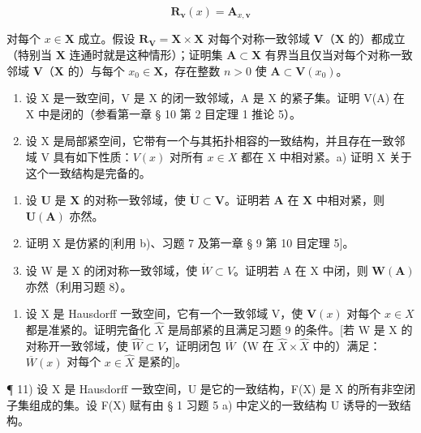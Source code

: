\[
\mathbf {R} _ {\mathbf {v}} (x) = \mathbf {A} _ {x, \mathbf {v}}
\]

对每个 \(x \in \mathbf{X}\) 成立。假设 \(\mathbf{R}_{\mathbf{V}} = \mathbf{X} \times \mathbf{X}\) 对每个对称一致邻域 \(\mathbf{V}\)（\(\mathbf{X}\) 的）都成立（特别当 \(\mathbf{X}\) 连通时就是这种情形）；证明集 \(\mathbf{A} \subset \mathbf{X}\) 有界当且仅当对每个对称一致邻域 \(\mathbf{V}\)（\(\mathbf{X}\) 的）与每个 \(x_0 \in \mathbf{X}\)，存在整数 \(n > 0\) 使 \(\mathbf{A} \subset \mathbf{V}(x_0)\)。

\begin{enumerate}
\def\labelenumi{\arabic{enumi})}
\setcounter{enumi}{7}
\item
  设 X 是一致空间，V 是 X 的闭一致邻域，A 是 X 的紧子集。证明 V(A) 在 X 中是闭的（参看第一章 § 10 第 2 目定理 1 推论 5）。
\item
  设 X 是局部紧空间，它带有一个与其拓扑相容的一致结构，并且存在一致邻域 V 具有如下性质：\(V(x)\) 对所有 \(x \in X\) 都在 X 中相对紧。a) 证明 X 关于这个一致结构是完备的。
\end{enumerate}

\begin{enumerate}
\def\labelenumi{\alph{enumi})}
\setcounter{enumi}{1}
\item
  设 \(\mathbf{U}\) 是 \(\mathbf{X}\) 的对称一致邻域，使 \(\dot{\mathbf{U}}\subset\mathbf{V}\)。证明若 \(\mathbf{A}\) 在 \(\mathbf{X}\) 中相对紧，则 \(\mathbf{U}(\mathbf{A})\) 亦然。
\item
  证明 X 是仿紧的{[}利用 b)、习题 7 及第一章 § 9 第 10 目定理 5{]}。
\item
  设 W 是 X 的闭对称一致邻域，使 \(\dot{W} \subset V\)。证明若 A 在 X 中闭，则 \(\mathbf{W}(\mathbf{A})\) 亦然（利用习题 8）。
\end{enumerate}

\begin{enumerate}
\def\labelenumi{\arabic{enumi})}
\setcounter{enumi}{9}
\tightlist
\item
  设 X 是 Hausdorff 一致空间，它有一个一致邻域 V，使 \(\mathbf{V}(x)\) 对每个 \(x \in X\) 都是准紧的。证明完备化 \(\hat{X}\) 是局部紧的且满足习题 9 的条件。{[}若 W 是 X 的对称开一致邻域，使 \(\hat{W} \subset V\)，证明闭包 \(\overline{W}\)（W 在 \(\hat{X} \times \hat{X}\) 中的）满足：\(\overline{W}(x)\) 对每个 \(x \in \hat{X}\) 是紧的{]}。
\end{enumerate}

¶ 11) 设 X 是 Hausdorff 一致空间，U 是它的一致结构，F(X) 是 X 的所有非空闭子集组成的集。设 F(X) 赋有由 § 1 习题 5 a) 中定义的一致结构 U 诱导的一致结构。

